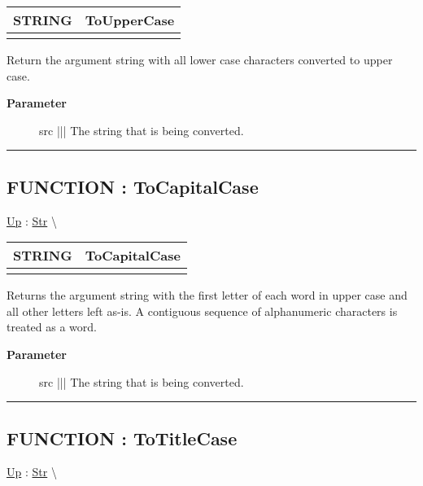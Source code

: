 {\renewcommand{\arraystretch}{1.5}
\begin{tabularx}{\textwidth}{|>{\raggedright\arraybackslash}l|X|}
\hline
\hspace{0pt}STRING & ToUpperCase \\
\hline
\multicolumn{2}{|>{\raggedright\arraybackslash}X|}{\hspace{0pt}(STRING src)} \\
\hline
\end{tabularx}
}

\par
Return the argument string with all lower case characters converted to upper case.

\par
\begin{description}
\item [\textbf{Parameter}] src ||| The string that is being converted.
\end{description}

\rule{\linewidth}{0.5pt}
\subsection*{FUNCTION : ToCapitalCase}
\hypertarget{ecldoc:str.tocapitalcase}{}
\hyperlink{ecldoc:Str}{Up} :
\hspace{0pt} \hyperlink{ecldoc:Str}{Str} \textbackslash 

{\renewcommand{\arraystretch}{1.5}
\begin{tabularx}{\textwidth}{|>{\raggedright\arraybackslash}l|X|}
\hline
\hspace{0pt}STRING & ToCapitalCase \\
\hline
\multicolumn{2}{|>{\raggedright\arraybackslash}X|}{\hspace{0pt}(STRING src)} \\
\hline
\end{tabularx}
}

\par
Returns the argument string with the first letter of each word in upper case and all other letters left as-is. A contiguous sequence of alphanumeric characters is treated as a word.

\par
\begin{description}
\item [\textbf{Parameter}] src ||| The string that is being converted.
\end{description}

\rule{\linewidth}{0.5pt}
\subsection*{FUNCTION : ToTitleCase}
\hypertarget{ecldoc:str.totitlecase}{}
\hyperlink{ecldoc:Str}{Up} :
\hspace{0pt} \hyperlink{ecldoc:Str}{Str} \textbackslash 

